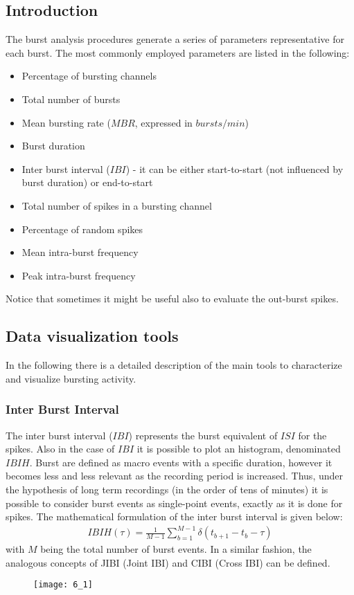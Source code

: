 \subsection{Introduction}
The burst analysis procedures generate a series of parameters representative for
each burst. The most commonly employed parameters are listed in the following:
\begin{itemize}
    \item Percentage of bursting channels
    \item Total number of bursts
    \item Mean bursting rate (\(MBR\), expressed in \(bursts/min\))
    \item Burst duration
    \item Inter burst interval (\(IBI\)) - it can be either start-to-start (not
          influenced by burst duration) or end-to-start
    \item Total number of spikes in a bursting channel
    \item Percentage of random spikes
    \item Mean intra-burst frequency
    \item Peak intra-burst frequency
\end{itemize}
Notice that sometimes it might be useful also to evaluate the out-burst spikes.

\subsection{Data visualization tools}
In the following there is a detailed description of the main tools to characterize and
visualize bursting activity.

\subsubsection{Inter Burst Interval}
The inter burst interval (\(IBI\)) represents the burst equivalent of \(ISI\) for
the spikes. Also in the case of \(IBI\) it is possible to plot an histogram,
denominated \(IBIH\). Burst are defined as macro events with a specific duration,
however it becomes less and less relevant as the recording period is increased.
Thus, under the hypothesis of long term recordings (in the order of tens of minutes)
it is possible to consider burst events as single-point events, exactly as it is done
for spikes. The mathematical formulation of the inter burst interval is given below:
\begin{align*}
    IBIH(\tau)=\frac{1}{M-1}\sum_{b=1}^{M-1}\delta(t_{b+1}-t_{b}-\tau)
\end{align*}
with \(M\) being the total number of burst events.
In a similar fashion, the analogous concepts of JIBI (Joint IBI) and CIBI (Cross IBI)
can be defined.
\begin{figure}[H]
    \texttt{[image: 6\_1]}
    \centering
\end{figure}

